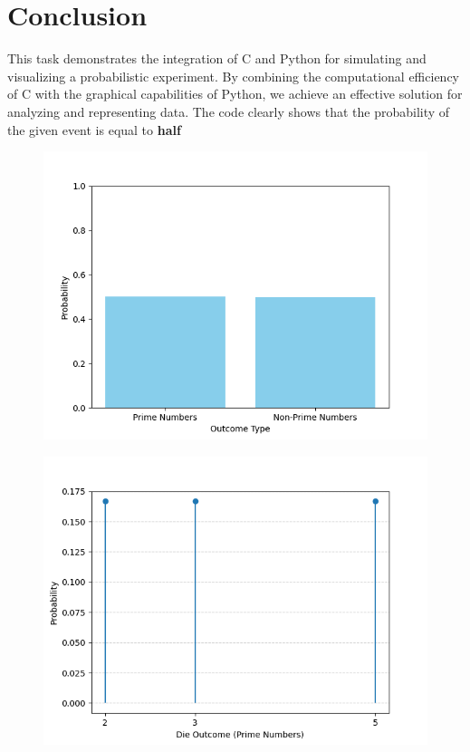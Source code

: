 \documentclass[journal]{IEEEtran}
\begin{document}
\section*{Conclusion}
This task demonstrates the integration of C and Python for simulating and visualizing a probabilistic experiment. By combining the computational efficiency of C with the graphical capabilities of Python, we achieve an effective solution for analyzing and representing data. The code clearly shows that the probability of the given event is equal to \textbf{half}
\begin{figure}[h!]
   \centering
   \includegraphics[width=\columnwidth]{figs/Figure_1.png}
\end{figure}
\begin{figure}[h!]
   \centering
   \includegraphics[width=\columnwidth]{figs/Figure_2.png}
\end{figure}
\end{document}
